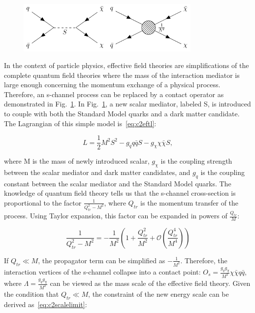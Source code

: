 \begin{figure}[htbp]
    \centering
    \includegraphics[width=0.8\textwidth]{chapters/c2/figures/eft-feyn-diagram}
    \label{fig:c2eftfeyndiagram}
\end{figure}

In the context of particle physics, effective field theories are simplifications of the complete quantum field theories where the mass of the interaction mediator is large enough concerning the momentum exchange of a physical process. Therefore, an s-channel process can be replaced by a contact operator as demonstrated in Fig.~\ref{fig:c2eftfeyndiagram}. In Fig.~\ref{fig:c2eftfeyndiagram}, a new scalar mediator, labeled S, is introduced to couple with both the Standard Model quarks and a dark matter candidate. The Lagrangian of this simple model is~\ref{eq:c2eftl}:

\begin{equation}
  L = \frac{1}{2}M^{2}S^{2}-g_{q}q\bar{q}S-g_{\chi}\chi\bar{\chi}S,
  \label{eq:c2eftl}
\end{equation}

where M is the mass of newly introduced scalar, $g_{\chi}$ is the coupling strength between the scalar mediator and dark matter candidates, and $g_{q}$ is the coupling constant between the scalar mediator and the Standard Model quarks. The knowledge of quantum field theory tells us that the s-channel cross-section is proportional to the factor $\frac{1}{Q_{tr}^{2}-M^{2}}$, where $Q_{tr}$ is the momentum transfer of the process. Using Taylor expansion, this factor can be expanded in powers of $\frac{Q_{tr}}{M}$: 

\begin{equation}
  \frac{1}{Q^{2}_{tr}-M^{2}} = -\frac{1}{M^{2}}(1+\frac{Q^{2}_{tr}}{M^{2}}+\mathcal{O}(\frac{Q^{4}_{tr}}{M^{4}}))
  \label{eq:c2taylorexp}
\end{equation}

If $Q_{tr} \ll M$, the propagator term can be simplified as $-\frac{1}{M^2}$. Therefore, the interaction vertices of the s-channel collapse into a contact point: $O_{s}=\frac{g_{q}g_{\chi}}{M^{2}}\chi\bar{\chi}q\bar{q}$, where $\Lambda=\frac{g_{q}g_{\chi}}{M^{2}}$ can be viewed as the mass scale of the effective field theory. Given the condition that $Q_{tr} \ll M$, the constraint of the new energy scale can be derived as~\ref{eq:c2scalelimit}:

